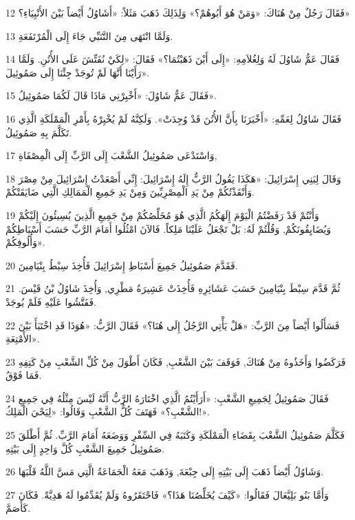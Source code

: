 \par 12 فَقَالَ رَجُلٌ مِنْ هُنَاكَ: «وَمَنْ هُوَ أَبُوهُمْ؟» وَلِذَلِكَ ذَهَبَ مَثَلاً: «أَشَاوُلُ أَيْضاً بَيْنَ الأَنْبِيَاءِ؟»
\par 13 وَلَمَّا انْتَهَى مِنَ التَّنَبِّي جَاءَ إِلَى الْمُرْتَفَعَةِ.
\par 14 فَقَالَ عَمُّ شَاوُلَ لَهُ وَلِغُلاَمِهِ: «إِلَى أَيْنَ ذَهَبْتُمَا؟» فَقَالَ: «لِكَيْ نُفَتِّشَ عَلَى الأُتُنِ. وَلَمَّا رَأَيْنَا أَنَّهَا لَمْ تُوجَدْ جِئْنَا إِلَى صَمُوئِيلَ».
\par 15 فَقَالَ عَمُّ شَاوُلَ: «أَخْبِرْنِي مَاذَا قَالَ لَكُمَا صَمُوئِيلُ».
\par 16 فَقَالَ شَاوُلُ لِعَمِّهِ: «أَخْبَرَنَا بِأَنَّ الأُتُنَ قَدْ وُجِدَتْ». وَلَكِنَّهُ لَمْ يُخْبِرْهُ بِأَمْرِ الْمَمْلَكَةِ الَّذِي تَكَلَّمَ بِهِ صَمُوئِيلُ.
\par 17 وَاسْتَدْعَى صَمُوئِيلُ الشَّعْبَ إِلَى الرَّبِّ إِلَى الْمِصْفَاةِ,
\par 18 وَقَالَ لِبَنِي إِسْرَائِيلَ: «هَكَذَا يَقُولُ الرَّبُّ إِلَهُ إِسْرَائِيلَ: إِنِّي أَصْعَدْتُ إِسْرَائِيلَ مِنْ مِصْرَ وَأَنْقَذْتُكُمْ مِنْ يَدِ الْمِصْرِيِّينَ وَمِنْ يَدِ جَمِيعِ الْمَمَالِكِ الَّتِي ضَايَقَتْكُمْ.
\par 19 وَأَنْتُمْ قَدْ رَفَضْتُمُ الْيَوْمَ إِلَهَكُمُ الَّذِي هُوَ مُخَلِّصُكُمْ مِنْ جَمِيعِ الَّذِينَ يُسِيئُونَ إِلَيْكُمْ وَيُضَايِقُونَكُمْ, وَقُلْتُمْ لَهُ: بَلْ تَجْعَلُ عَلَيْنَا مَلِكاً. فَالآنَ امْثُلُوا أَمَامَ الرَّبِّ حَسَبَ أَسْبَاطِكُمْ وَأُلُوفِكُمْ».
\par 20 فَقَدَّمَ صَمُوئِيلُ جَمِيعَ أَسْبَاطِ إِسْرَائِيلَ فَأُخِذَ سِبْطُ بِنْيَامِينَ.
\par 21 ثُمَّ قَدَّمَ سِبْطَ بِنْيَامِينَ حَسَبَ عَشَائِرِهِ فَأُخِذَتْ عَشِيرَةُ مَطْرِي, وَأُخِذَ شَاوُلُ بْنُ قَيْسَ. فَفَتَّشُوا عَلَيْهِ فَلَمْ يُوجَدْ.
\par 22 فَسَأَلُوا أَيْضاً مِنَ الرَّبِّ: «هَلْ يَأْتِي الرَّجُلُ إِلَى هُنَا؟» فَقَالَ الرَّبُّ: «هُوَذَا قَدِ اخْتَبَأَ بَيْنَ الأَمْتِعَةِ».
\par 23 فَرَكَضُوا وَأَخَذُوهُ مِنْ هُنَاكَ, فَوَقَفَ بَيْنَ الشَّعْبِ, فَكَانَ أَطْوَلَ مِنْ كُلِّ الشَّعْبِ مِنْ كَتِفِهِ فَمَا فَوْقُ.
\par 24 فَقَالَ صَمُوئِيلُ لِجَمِيعِ الشَّعْبِ: «أَرَأَيْتُمُ الَّذِي اخْتَارَهُ الرَّبُّ أَنَّهُ لَيْسَ مِثْلُهُ فِي جَمِيعِ الشَّعْبِ؟» فَهَتَفَ كُلُّ الشَّعْبِ وَقَالُوا: «لِيَحْيَ الْمَلِكُ!».
\par 25 فَكَلَّمَ صَمُوئِيلُ الشَّعْبَ بِقَضَاءِ الْمَمْلَكَةِ وَكَتَبَهُ فِي السِّفْرِ وَوَضَعَهُ أَمَامَ الرَّبِّ. ثُمَّ أَطْلَقَ صَمُوئِيلُ جَمِيعَ الشَّعْبِ كُلَّ وَاحِدٍ إِلَى بَيْتِهِ.
\par 26 وَشَاوُلُ أَيْضاً ذَهَبَ إِلَى بَيْتِهِ إِلَى جِبْعَةَ, وَذَهَبَ مَعَهُ الْجَمَاعَةُ الَّتِي مَسَّ اللَّهُ قَلْبَهَا.
\par 27 وَأَمَّا بَنُو بَلِيَّعَالَ فَقَالُوا: «كَيْفَ يُخَلِّصُنَا هَذَا؟» فَاحْتَقَرُوهُ وَلَمْ يُقَدِّمُوا لَهُ هَدِيَّةً. فَكَانَ كَأَصَمَّ.

